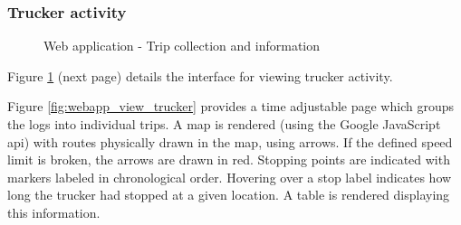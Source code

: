 \subsubsection{Trucker activity}
\begin{figure}
\centering
\caption{Web application - Trip collection and information}
\label{fig:webapp_trucker_details}
\end{figure}
Figure \ref{fig:webapp_trucker_details} (next page) details the interface for viewing trucker activity.

Figure \ref{fig:webapp_view_trucker} provides a time adjustable page which groups the logs into individual trips.
A map is rendered (using the Google JavaScript \Ac{api}) with routes physically drawn in the map, using arrows.
If the defined speed limit is broken, the arrows are drawn in red.
Stopping points are indicated with markers labeled in chronological order.
Hovering over a stop label indicates how long the trucker had stopped at a given location.
A table is rendered displaying this information.

